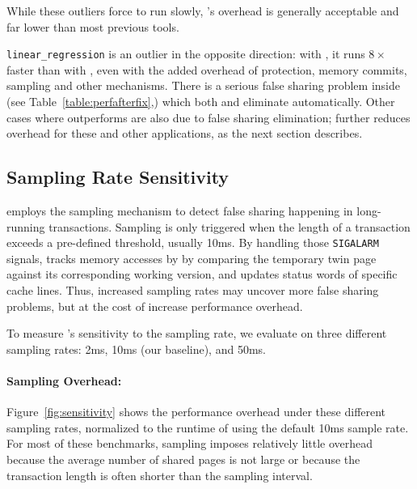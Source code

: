  
While these outliers force \SheriffDetect{} to run
slowly, \SheriffDetect{}’s overhead is generally acceptable
and far lower than most previous tools.

\texttt{linear\_regression} is an outlier in the opposite direction: with \SheriffDetect{}, it runs $8\times$ faster than with \pthreads{}, even with the added overhead of protection, memory commits, sampling and 
other mechanisms.  There is a serious false sharing problem inside (see Table~\ref{table:perfafterfix},) which both \sheriffdetect{} and \sheriffprotect{} eliminate automatically. Other cases where \sheriffdetect{}
outperforms \pthreads{} are also due to false sharing elimination;
\SheriffProtect{} further reduces overhead for these
and other applications, as the next section describes.

\subsection{\SheriffDetect{} Sampling Rate Sensitivity}
\label{sec:results-sampling-overhead}

\SheriffDetect{} employs the sampling mechanism to detect false sharing happening in long-running transactions. Sampling is only triggered when the length of a transaction exceeds a pre-defined threshold, usually 10ms. By handling those \texttt{SIGALARM} signals, \SheriffDetect{} tracks memory accesses by by comparing the temporary twin page against its
corresponding working version, and updates status words of specific cache lines. Thus, increased sampling rates may uncover more false sharing problems, but at the cost of increase performance overhead. 

To measure \sheriffdetect{}'s sensitivity to the sampling rate, we evaluate on three different sampling rates: 2ms, 10ms (our baseline), and 50ms.

\paragraph{Sampling Overhead:} Figure~\ref{fig:sensitivity} shows the performance overhead under these different sampling rates, normalized to the runtime of using  the default 10ms sample rate. For most of these benchmarks, sampling imposes relatively little overhead because the average
number of shared pages is not large or because the
transaction length is often shorter than the sampling interval.

